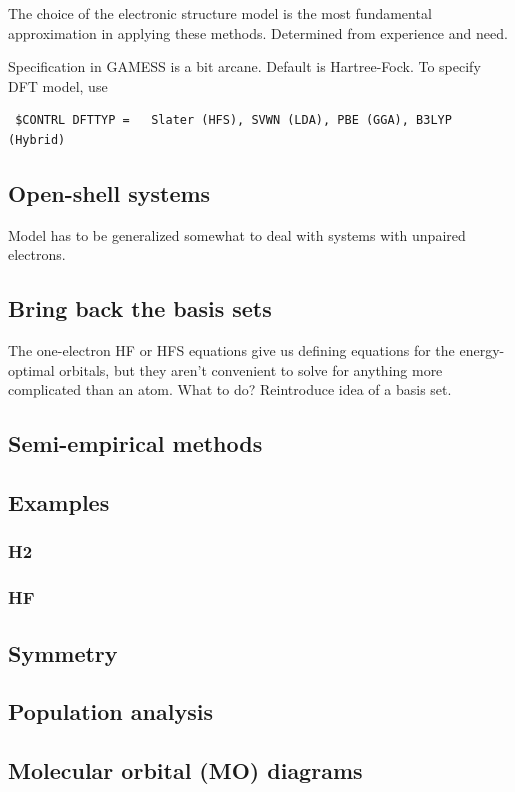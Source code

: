 \documentclass[11pt]{article}
\begin{document}
The choice of the electronic structure model is the most fundamental approximation in
applying these methods.  Determined from experience and need.

Specification in GAMESS is a bit arcane.  Default is Hartree-Fock. To specify DFT model, use
\begin{verbatim}
 $CONTRL DFTTYP =   Slater (HFS), SVWN (LDA), PBE (GGA), B3LYP (Hybrid)
\end{verbatim}

\subsection{Open-shell systems}
\label{sec:org12ae0a4}
Model has to be generalized somewhat to deal with systems with unpaired electrons.

\subsection{Bring back the basis sets}
\label{sec:org56812c9}
The one-electron HF or HFS equations give us defining equations for
the energy-optimal orbitals, but they aren't convenient to solve for
anything more complicated than an atom. What to do? Reintroduce idea
of a basis set.

\subsection{Semi-empirical methods}
\label{sec:orgd0669f5}
\subsection{Examples}
\label{sec:orgf1be51e}
\subsubsection{H2}
\label{sec:org19edaad}
\subsubsection{HF}
\label{sec:orgcfc2787}
\subsection{Symmetry}
\label{sec:orga70e5ea}
\subsection{Population analysis}
\label{sec:org74d5e10}
\subsection{Molecular orbital (MO) diagrams}
\label{sec:orga4c31c9}
\end{document}
